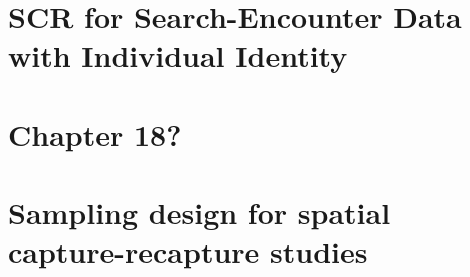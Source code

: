 \documentclass{book}
\begin{document}








%
\chapter{SCR for Search-Encounter Data with Individual Identity}










\chapter{Chapter 18?}

%
\chapter{Sampling design for spatial capture-recapture studies }















\end{document}
